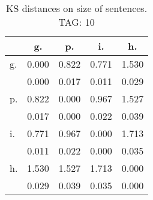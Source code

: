 \begin{table}[h!]
\begin{center}
\begin{tabular}{| l | c | c | c | c |}\hline
 & g. & p. & i. & h. \\\hline
g. & 0.000  & 0.822  & 0.771  & 1.530 \\\hline
 & 0.000  & 0.017  & 0.011  & 0.029 \\\hline
p. & 0.822  & 0.000  & 0.967  & 1.527 \\\hline
 & 0.017  & 0.000  & 0.022  & 0.039 \\\hline
i. & 0.771  & 0.967  & 0.000  & 1.713 \\\hline
 & 0.011  & 0.022  & 0.000  & 0.035 \\\hline
h. & 1.530  & 1.527  & 1.713  & 0.000 \\\hline
 & 0.029  & 0.039  & 0.035  & 0.000 \\\hline
\end{tabular}
\caption{KS distances on size of sentences. TAG: 10}
\end{center}
\end{table}